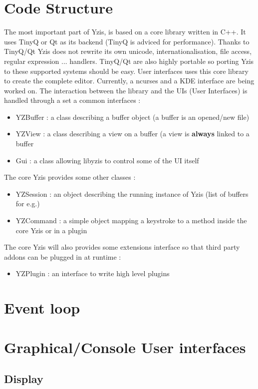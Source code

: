 \newpage
\section{Code Structure}
The most important part of Yzis, is based on a core library written in C++. It uses TinyQ or Qt as its backend (TinyQ is adviced for performance). Thanks to TinyQ/Qt Yzis does not rewrite its own unicode, internationalisation, file access, regular expression ... handlers. TinyQ/Qt are also highly portable so porting Yzis to these supported systems should be easy.\newline
User interfaces uses this core library to create the complete editor. Currently, a ncurses and a KDE interface are being worked on.
The interaction between the library and the UIs (User Interfaces) is handled through a set a common interfaces :
\begin{itemize}
\item YZBuffer : a class describing a buffer object (a buffer is an opened/new file)
\item YZView : a class describing a view on a buffer (a view is {\bf always} linked to a buffer
\item Gui : a class allowing libyzis to control some of the UI itself
\end{itemize}
The core Yzis provides some other classes :
\begin{itemize}
\item YZSession : an object describing the running instance of Yzis (list of buffers for e.g.)
\item YZCommand : a simple object mapping a keystroke to a method inside the core Yzis or in a plugin
\end{itemize}
The core Yzis will also provides some extensions interface so that third party addons can be plugged in at runtime :
\begin{itemize}
\item YZPlugin : an interface to write high level plugins
\end{itemize}

\newpage
\section{Event loop}
\newpage
\section{Graphical/Console User interfaces}
\subsection{Display}

